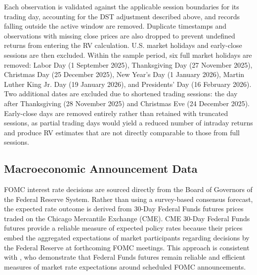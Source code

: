 \documentclass[12pt,a4paper]{report}
\begin{document}
Each observation is validated against the applicable session boundaries for its trading day, accounting for the DST adjustment described above, and records falling outside the active window are removed. Duplicate timestamps and observations with missing close prices are also dropped to prevent undefined returns from entering the RV calculation. U.S. market holidays and early-close sessions are then excluded. Within the sample period, six full market holidays are removed: Labor Day (1 September 2025), Thanksgiving Day (27 November 2025), Christmas Day (25 December 2025), New Year's Day (1 January 2026), Martin Luther King Jr. Day (19 January 2026), and Presidents' Day (16 February 2026). Two additional dates are excluded due to shortened trading sessions: the day after Thanksgiving (28 November 2025) and Christmas Eve (24 December 2025). Early-close days are removed entirely rather than retained with truncated sessions, as partial trading days would yield a reduced number of intraday returns and produce RV estimates that are not directly comparable to those from full sessions.


\subsection{Macroeconomic Announcement Data}

FOMC interest rate decisions are sourced directly from the Board of Governors of the Federal Reserve System. Rather than using a survey-based consensus forecast, the expected rate outcome is derived from 30-Day Federal Funds futures prices traded on the Chicago Mercantile Exchange (CME). CME 30-Day Federal Funds futures provide a reliable measure of expected policy rates because their prices embed the aggregated expectations of market participants regarding decisions by the Federal Reserve at forthcoming FOMC meetings. This approach is consistent with \cite{BauerSwanson2023}, who demonstrate that Federal Funds futures remain reliable and efficient measures of market rate expectations around scheduled FOMC announcements.
\end{document}
